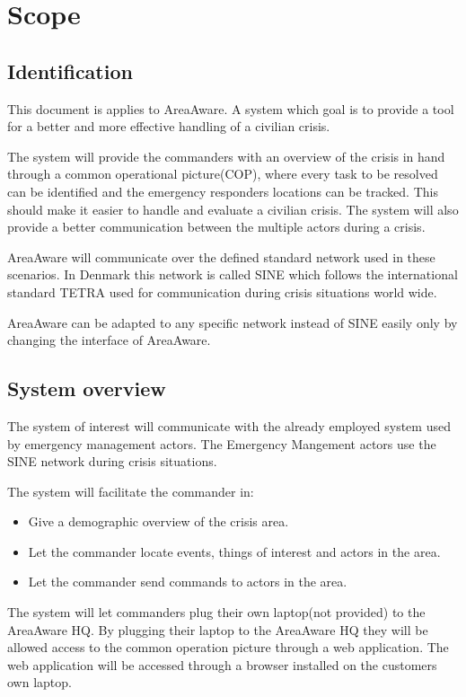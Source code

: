 
\chapter{Scope}
\label{chp:scope}

\section{Identification}
This document is applies to AreaAware.
A system which goal is to provide a tool for a better and more effective handling of a civilian crisis.

The system will provide the commanders with an overview of the crisis in hand through a common operational picture(COP), where every task to be resolved can be identified and the emergency responders locations can be tracked.
This should make it easier to handle and evaluate a civilian crisis. 
The system will also provide a better communication between the multiple actors during a crisis.

AreaAware will communicate over the defined standard network used in these scenarios.
In Denmark this network is called SINE which follows the international standard TETRA used for communication during crisis situations world wide.

AreaAware can be adapted to any specific network instead of SINE easily only by changing the interface of AreaAware.


\section{System overview}
The system of interest will communicate with the already employed system used by emergency management actors. The Emergency Mangement actors use the SINE network during crisis situations.

The system will facilitate the commander in:
\begin{itemize}
    \item Give a demographic overview of the crisis area.
    \item Let the commander locate events, things of interest and actors in the area.
    \item Let the commander send commands to actors in the area.
\end{itemize}

The system will let commanders plug their own laptop(not provided) to the AreaAware HQ.
By plugging their laptop to the AreaAware HQ they will be allowed access to the common operation picture through a web application. 
The web application will be accessed through a browser installed on the customers own laptop.

